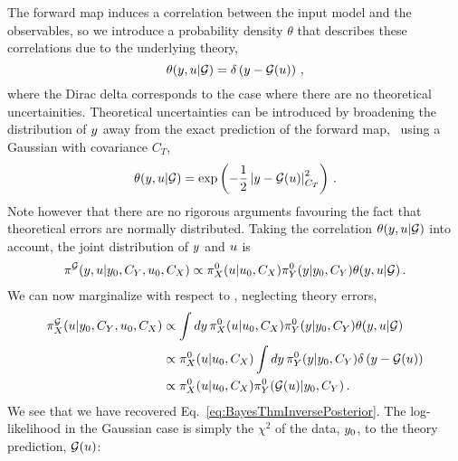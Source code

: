 The forward map induces a correlation between the input model and the
observables, so we introduce a probability density $\theta$ that describes these
correlations due to the underlying theory,  
\begin{equation}
  \label{eq:ThetaCorr}
  \theta(y,u|\mathcal{G}) = \delta\left(y - \mathcal{G}(u)\right)\, ,
\end{equation}
where the Dirac delta corresponds to the case where there are no theoretical
uncertainities. Theoretical uncertainties can be introduced by broadening the
distribution of $y$ away from the exact prediction of the forward map, \eg\
using a Gaussian with covariance $C_T$,
\begin{equation}
  \label{eq:TheoryErrors}
  \theta(y,u|\mathcal{G}) = \exp\left(
    -\frac12 
    \left| y - \mathcal{G}(u)
    \right|_{C_T}^2\right)\, .
\end{equation}
Note however that there are no rigorous arguments favouring the fact that
theoretical errors are normally distributed. Taking the correlation
$\theta(y,u|\mathcal{G})$ into account, the joint distribution of
$y$ and $u$ is
\begin{align}
  \label{eq:JointYAndU}
  \pi^{\mathcal{G}}(y,u|y_0,C_{Y},u_0,C_X) 
  \propto 
  \pi_{X}^0(u|u_0, C_X) 
  \pi_{Y}^0(y|y_0,C_{Y}) 
  \theta(y,u|\mathcal{G})\, .
\end{align}
We can now marginalize with respect to \obs, neglecting theory errors, 
\begin{align}
  \label{eq:MarginOne}
  \pi^{\mathcal{G}}_{X}(u|y_0,C_{Y},u_0,C_X) 
  &\propto \int dy\, 
    \pi_{X}^0(u|u_0,C_X) 
    \pi_{Y}^0(y|y_0,C_{Y}) 
    \theta(y,u|\mathcal{G}) \\
  & \propto \pi_{X}^0(u|u_0,C_X)  
    \int dy\, 
    \pi_{Y}^0(y|y_0,C_{Y}) 
    \delta\left(y-\mathcal{G}(u)\right) \\
  & \propto 
    \pi_{X}^0(u|u_0,C_X) 
    \pi_{Y}^0(\mathcal{G}(u)|y_0,C_{Y})\, .
\end{align}
We see that we have recovered Eq.~\ref{eq:BayesThmInversePosterior}. The
log-likelihood in the Gaussian case is simply the $\chi^2$ of the data,
$y_0$, to the theory prediction, $\mathcal{G}(u)$:
